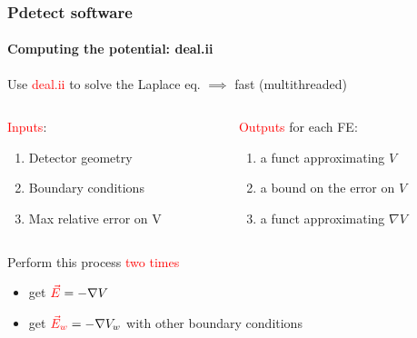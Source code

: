\documentclass[14pt]{beamer}
\begin{document}
\begin{frame}
  \frametitle{Pdetect software}
  \framesubtitle{Computing the potential: deal.ii}

\fontsize{13pt}{7.2}\selectfont

Use \textcolor{red}{deal.ii} to solve the Laplace eq. $\implies$
fast (multithreaded)
\newline

\vspace{2em}

\begin{columns}
  \begin{column}{0.5\textwidth}

    \textcolor{red}{Inputs}:
      \begin{enumerate}
        \item Detector geometry
        \item Boundary conditions
        \item Max relative error on V
      \end{enumerate}

  \end{column}

  \begin{column}{0.6\textwidth}
    \textcolor{red}{Outputs} for each FE:
    \begin{enumerate}
      \item a funct approximating $V$
      \item a bound on the error on $V$
      \item a funct approximating $\nabla V$
    \end{enumerate}

  \end{column}
\end{columns}

\vspace{2em}

Perform this process \textcolor{red}{two times}
\begin{itemize}
  \item get $\textcolor{red}{\vec{E}} = -\nabla V$
  \item get $\textcolor{red}{\vec{E}_w} = -\nabla V_w$ with other boundary conditions
\end{itemize}
\end{frame}
\end{document}
